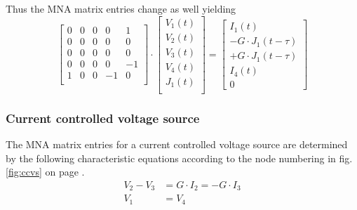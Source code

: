 Thus the MNA matrix entries change as well yielding
\begin{equation}
\begin{bmatrix}
0 & 0 & 0 & 0 & 1\\
0 & 0 & 0 & 0 & 0\\
0 & 0 & 0 & 0 & 0\\
0 & 0 & 0 & 0 & -1\\
1 & 0 & 0 & -1 & 0\\
\end{bmatrix}
\cdot
\begin{bmatrix}
V_1\left(t\right)\\
V_2\left(t\right)\\
V_3\left(t\right)\\
V_4\left(t\right)\\
J_1\left(t\right)\\
\end{bmatrix}
=
\begin{bmatrix}
I_1\left(t\right)\\
-G\cdot J_1\left(t -\tau\right)\\
+G\cdot J_1\left(t -\tau\right)\\
I_4\left(t\right)\\
0
\end{bmatrix}
\end{equation}

\subsubsection{Current controlled voltage source}

The MNA matrix entries for a current controlled voltage source are
determined by the following characteristic equations according to the
node numbering in fig. \ref{fig:ccvs} on page \pageref{fig:ccvs}.
\begin{align}
\label{eq:ccvs_dc}
V_2 - V_3 &= G\cdot I_2 = -G\cdot I_3\\
V_1 &= V_4
\end{align}

